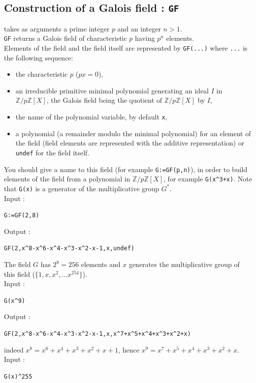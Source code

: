 \documentclass[a4paper,11pt]{book}
\newcommand{\Z}{{\mathbb{Z}}}
\begin{document}
\subsection{Construction of a Galois field : {\tt GF}}
 takes as arguments a prime integer $p$ 
and an integer $n>1$.\\
{\tt GF} returns a Galois field of characteristic $p$ having $p^n$
elements.\\
Elements of the field and the field itself
are represented by {\tt GF(...)} where {\tt ...} is the following 
sequence:
\begin{itemize}
\item the characteristic $p$ ($px=0$),
\item an irreducible primitive minimal polynomial generating an
ideal $I$ in $\Z/p\Z[X]$, the Galois field being the quotient
of $\Z/p\Z[X]$ by $I$,
\item the name of the polynomial variable, by default {\tt x},
\item a polynomial (a remainder modulo the minimal polynomial) 
for an element of the field
(field elements are represented with the additive representation)
or {\tt undef} for the field itself.
\end{itemize}
You should give a name to this field (for example {\tt G:=GF(p,n)}),
in order to build elements of the field from a polynomial in
$\Z/p\Z[X]$, for example {\tt G(x\verb|^|3+x)}. Note that {\tt G(x)}
is a generator of the multiplicative group {\tt $G^*$}.\\
Input :
\begin{center}{\tt G:=GF(2,8)}\end{center}
Output :
\begin{center}{\tt GF(2,x\verb|^|8-x\verb|^|6-x\verb|^|4-x\verb|^|3-x\verb|^|2-x-1,x,undef)}\end{center}
The field $G$ has $2^8=256$ elements and  
$x$ generates the multiplicative group
of this field  ($\{ 1,x,x^2,...x^{254} \}$).\\
Input :
\begin{center}{\tt G(x\verb|^|9)}\end{center}
Output :
\begin{center}{\tt GF(2,x\verb|^|8-x\verb|^|6-x\verb|^|4-x\verb|^|3-x\verb|^|2-x-1,x,x\verb|^|7+x\verb|^|5+x\verb|^|4+x\verb|^|3+x\verb|^|2+x)}\end{center}
indeed $x^8=x^6+x^4+x^3+x^2+x+1$, hence $x^9=x^7+x^5+x^4+x^3+x^2+x$.\\
Input :
\begin{center}{\tt G(x)\verb|^|255}\end{center}
\end{document}
